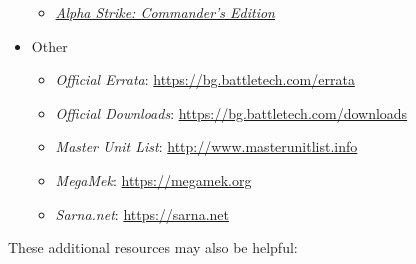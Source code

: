 \begin{itemize}
\begin{itemize}
    \item \emph{\href{https://store.catalystgamelabs.com/products/battletech-alpha-strike-commanders-edition}{Alpha Strike: Commander's Edition}}

  \end{itemize}

  \item Other

  \begin{itemize}

    \item \emph{Official Errata}: \href{https://bg.battletech.com/errata}{https://bg.battletech.com/errata}

    \item \emph{Official Downloads}: \href{https://bg.battletech.com/downloads}{https://bg.battletech.com/downloads}

    \item \emph{Master Unit List}: \href{http://www.masterunitlist.info}{http://www.masterunitlist.info}

    \item \emph{MegaMek}: \href{https://megamek.org}{https://megamek.org}

    \item \emph{Sarna.net}: \href{https://sarna.net}{https://sarna.net}

  \end{itemize}

\end{itemize}

These additional resources may also be helpful:

